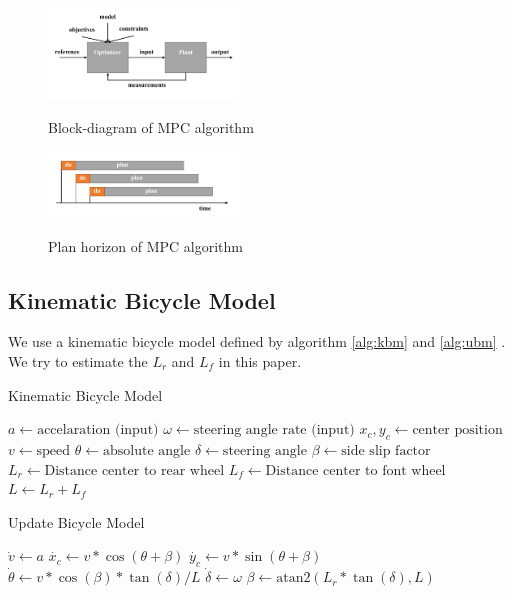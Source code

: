 \documentclass[twoside,twocolumn]{article}
\begin{document}
\begin{figure}[h]
    \caption{Block-diagram of MPC algorithm}
    \centering
    \includegraphics[width=0.45\textwidth]{fig_mpc.pdf}
    \label{fig:mpc}
\end{figure}

\begin{figure}[h]
    \caption{Plan horizon of MPC algorithm}
    \centering
    \includegraphics[width=0.45\textwidth]{fig_mpc_plan.pdf}
    \label{fig:mpc_plan}
\end{figure}

\subsection{Kinematic Bicycle Model}

We use a kinematic bicycle model defined by algorithm \ref{alg:kbm} and \ref{alg:ubm} \cite{kinematicBicycleModel}. We try to estimate the $L_r$ and $L_f$ in this paper.
\begin{algorithm}
    \caption{Kinematic Bicycle Model}
    \label{alg:kbm}
    \begin{algorithmic}
        \State $a \gets \text{accelaration (input)}$
        \State $\omega \gets \text{steering angle rate (input)}$
        \State $x_c, y_c \gets \text{center position}$
        \State $v \gets \text{speed}$
        \State $\theta \gets \text{absolute angle}$
        \State $\delta \gets \text{steering angle}$
        \State $\beta \gets \text{side slip factor}$
        \State $L_r \gets \text{Distance center to rear wheel}$
        \State $L_f \gets \text{Distance center to font wheel}$
        \State $L \gets L_r + L_f$
    \end{algorithmic}
\end{algorithm}

\begin{algorithm}
    \caption{Update Bicycle Model}
    \label{alg:ubm}
    \begin{algorithmic}[1]
        \State $\dot{v} \gets a$
        \State $\dot{x_c} \gets v * \cos{(\theta + \beta)}$
        \State $\dot{y_c} \gets v * \sin{(\theta + \beta)}$
        \State $\dot{\theta} \gets v * \cos{(\beta)} * \tan{(\delta)} / L$
        \State $\dot{\delta} \gets \omega$
        \State $\beta \gets \text{atan2}(L_r * \tan{(\delta)}, L)$
    \end{algorithmic}
\end{algorithm}
\end{document}
